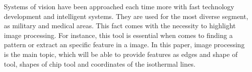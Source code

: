 Systems of vision have been approached each time more with fast technology development and intelligent systems. They are used for the most diverse segment, as military and medical areas. This fact comes with the necessity to highlight image processing. For instance, this tool is essential when comes to finding a pattern or extract an specific feature in a image. 
In this paper, image processing is the main topic, which will be able to provide features as edges and shape of tool, shapes of chip tool and coordinates of the isothermal lines.